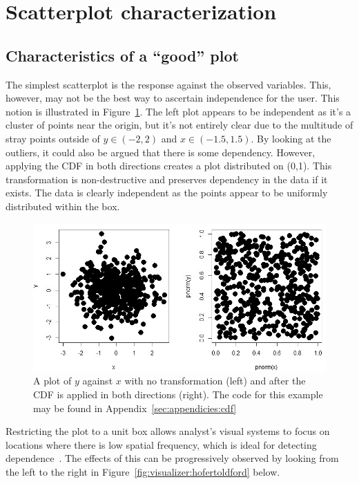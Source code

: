 \section{Scatterplot characterization}
\label{sec:visualizer:scatterplot}

\subsection{Characteristics of a ``good'' plot}
\label{sec:visualizer:scatterplot:goodplot}

The simplest scatterplot is the response against the observed variables. This,
however, may not be the best way to ascertain independence for the user. This
notion is illustrated in Figure~\ref{fig:visualizer:cdf}. The left plot appears
to be independent as it's a cluster of points near the origin, but it's not
entirely clear due to the multitude of stray points outside of $y\in (-2,2)$ 
and $x\in(-1.5,1.5)$. By looking at the outliers, it could also be argued that 
there is some dependency. However, applying the CDF in both directions creates 
a plot distributed on (0,1). This transformation is non-destructive and 
preserves dependency in the data if it exists. The data is clearly independent 
as the points appear to be uniformly distributed within the box.

\begin{figure}[htb]
	\begin{center}
		\includegraphics[width=0.75\linewidth]{ch-visualizer/figures/cdf}
		\caption[A plot of $y$ against $x$ after the CDF is applied in both
		directions.]{A plot of $y$ against $x$ with no transformation (left) 
		and after
			the CDF is applied in both directions (right). The code for this 
			example may be
			found in Appendix~\ref{sec:appendicies:cdf}}
		\label{fig:visualizer:cdf}
	\end{center}
\end{figure}

Restricting the plot to a unit box allows analyst's visual systems to focus on
locations where there is low spatial frequency, which is ideal for detecting
dependence~\cite{hofert2016}. The effects of this can be progressively observed
by looking from the left to the right in
Figure~\ref{fig:visualizer:hofertoldford} below.

